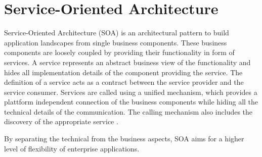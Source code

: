\section{Service-Oriented Architecture}
Service-Oriented Architecture (SOA) is an architectural pattern to build application landscapes from single business components. These business components are loosely coupled by providing their functionality in form of services.  A service represents an abstract business view of the functionality and hides all implementation details of the component providing the service. The definition of a service acts as a contract between the service provider and the service consumer. Services are called using a unified mechanism, which provides a plattform independent connection of the business components while hiding all the technical details of the communication. The calling mechanism also includes the discovery of the appropriate service
\citep{Richter:2005ci}.

By separating the technical from the business aspects, SOA aims for a higher level of flexibility of enterprise applications.
